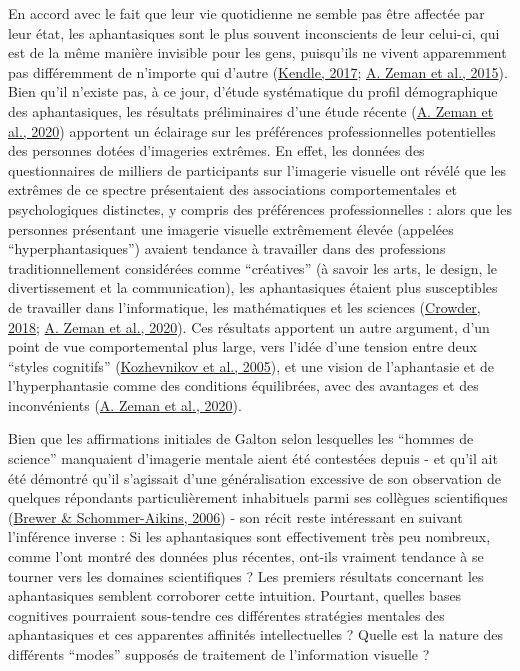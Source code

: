 \documentclass[
  12pt,
]{article}
\begin{document}
En accord avec le fait que leur vie quotidienne ne semble pas être
affectée par leur état, les aphantasiques sont le plus souvent
inconscients de leur celui-ci, qui est de la même manière invisible pour
les gens, puisqu'ils ne vivent apparemment pas différemment de n'importe
qui d'autre
(\protect\hyperlink{ref-kendleAphantasiaExperiencesPerceptions2017}{Kendle,
2017}; \protect\hyperlink{ref-zemanLivesImageryCongenital2015}{A. Zeman
et al., 2015}). Bien qu'il n'existe pas, à ce jour, d'étude systématique
du profil démographique des aphantasiques, les résultats préliminaires
d'une étude récente
(\protect\hyperlink{ref-zemanPhantasiaPsychologicalSignificance2020}{A.
Zeman et al., 2020}) apportent un éclairage sur les préférences
professionnelles potentielles des personnes dotées d'imageries extrêmes.
En effet, les données des questionnaires de milliers de participants sur
l'imagerie visuelle ont révélé que les extrêmes de ce spectre
présentaient des associations comportementales et psychologiques
distinctes, y compris des préférences professionnelles : alors que les
personnes présentant une imagerie visuelle extrêmement élevée (appelées
``hyperphantasiques'') avaient tendance à travailler dans des
professions traditionnellement considérées comme ``créatives'' (à savoir
les arts, le design, le divertissement et la communication), les
aphantasiques étaient plus susceptibles de travailler dans
l'informatique, les mathématiques et les sciences
(\protect\hyperlink{ref-crowderDifferencesSpatialVisualization2018}{Crowder,
2018};
\protect\hyperlink{ref-zemanPhantasiaPsychologicalSignificance2020}{A.
Zeman et al., 2020}). Ces résultats apportent un autre argument, d'un
point de vue comportemental plus large, vers l'idée d'une tension entre
deux ``styles cognitifs''
(\protect\hyperlink{ref-kozhevnikovSpatialObjectVisualizers2005}{Kozhevnikov
et al., 2005}), et une vision de l'aphantasie et de l'hyperphantasie
comme des conditions équilibrées, avec des avantages et des
inconvénients
(\protect\hyperlink{ref-zemanPhantasiaPsychologicalSignificance2020}{A.
Zeman et al., 2020}).

Bien que les affirmations initiales de Galton selon lesquelles les
``hommes de science'' manquaient d'imagerie mentale aient été contestées
depuis - et qu'il ait été démontré qu'il s'agissait d'une généralisation
excessive de son observation de quelques répondants particulièrement
inhabituels parmi ses collègues scientifiques
(\protect\hyperlink{ref-brewerScientistsAreNot2006}{Brewer \&
Schommer-Aikins, 2006}) - son récit reste intéressant en suivant
l'inférence inverse : Si les aphantasiques sont effectivement très peu
nombreux, comme l'ont montré des données plus récentes, ont-ils vraiment
tendance à se tourner vers les domaines scientifiques ? Les premiers
résultats concernant les aphantasiques semblent corroborer cette
intuition. Pourtant, quelles bases cognitives pourraient sous-tendre ces
différentes stratégies mentales des aphantasiques et ces apparentes
affinités intellectuelles ? Quelle est la nature des différents
``modes'' supposés de traitement de l'information visuelle ?
\end{document}
